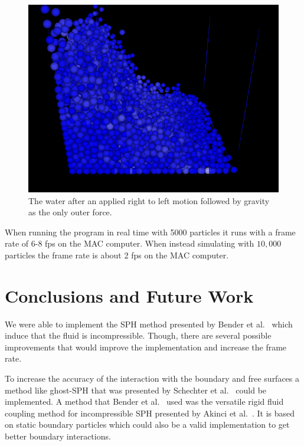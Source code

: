 	\begin{figure}[h!]
		\includegraphics[width=\linewidth]{img/frame0882.png}
		\caption{The water after an applied right to left motion followed by gravity as the only outer force.}
		\label{fig:res4}
	\end{figure}


	When running the program in real time with 5000 particles it runs with a frame rate of 6-8 fps on the MAC computer.
	When instead simulating with $10,000$ particles the frame rate is about 2 fps on the MAC computer.

\section{Conclusions and Future Work}

    We were able to implement the SPH method presented by Bender et al.~\cite{bender} which induce that the fluid is incompressible. Though, there are several possible improvements that would improve the implementation and increase the frame rate.  

    To increase the accuracy of the interaction with the boundary and free surfaces a method like ghost-SPH that was presented by Schechter et al.~\cite{ghost} could be implemented.
    A method that Bender et al.~\cite{bender} used was the versatile rigid fluid coupling method for incompressible SPH presented by Akinci et al.~\cite{akinci2012versatile}.
    It is based on static boundary particles which could also be a valid implementation to get better boundary interactions.

